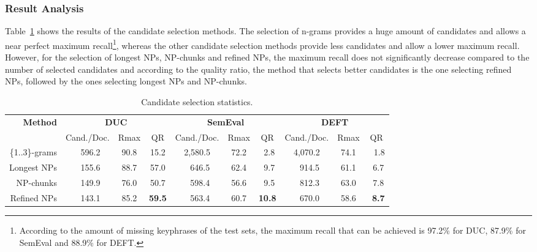     \subsubsection{Result Analysis}
    \label{subsubsec:candidate_extraction_result_analysis}
      Table~\ref{tab:candidate_extraction_statistics} shows the results of the
      candidate selection methods. The selection of n-grams provides a huge
      amount of candidates and allows a near perfect maximum
      recall\footnote{According to the amount of missing keyphrases of the test
      sets, the maximum recall that can be achieved is 97.2\% for DUC, 87.9\%
      for SemEval and 88.9\% for DEFT.}, whereas the other candidate selection
      methods provide less candidates and allow a lower maximum recall. However,
      for the selection of longest NPs, NP-chunks and refined NPs, the maximum
      recall does not significantly decrease compared to the number of selected
      candidates and according to the quality ratio, the method that selects
      better candidates is the one selecting refined NPs, followed by the ones
      selecting longest NPs and NP-chunks.
      \begin{table}
        \centering
        \begin{tabular}{r@{~~}c@{~~}c@{~~}c@{~~}c@{~~}c@{~~}c@{~~}c@{~~}c@{~~}c}
          \toprule
          \multirow{2}{*}[-2pt]{\textbf{Method}} & \multicolumn{3}{c}{\textbf{DUC}} & \multicolumn{3}{c}{\textbf{SemEval}} & \multicolumn{3}{c}{\textbf{DEFT}}\\
          \cmidrule(r){2-4}\cmidrule(r){5-7}\cmidrule{8-10}
          & Cand./Doc. & Rmax & QR & Cand./Doc. & Rmax & QR & Cand./Doc. & Rmax & QR\\
          \midrule
          \{1..3\}-grams & $~~~$596.2 & 90.8 & 15.2 & 2,580.5 & 72.2 & $~~$2.8 & 4,070.2 & 74.1 & $~~~$1.8\\
          Longest NPs & $~~~$155.6 & 88.7 & 57.0 & $~~~$646.5 & 62.4 & $~~$9.7 & $~~~$914.5 & 61.1 & $~~$6.7\\
          NP-chunks & $~~~$149.9 & 76.0 & 50.7 & $~~~$598.4 & 56.6 & $~~$9.5 & $~~~$812.3 & 63.0 & $~~$7.8\\
          Refined NPs & $~~~$143.1 & 85.2 & \textbf{59.5} & $~~~$563.4 & 60.7 & \textbf{10.8} & $~~~$670.0 & 58.6 & \textbf{$~~$8.7}\\
          \bottomrule
        \end{tabular}
        \caption{Candidate selection statistics.
                 \label{tab:candidate_extraction_statistics}}
      \end{table}

